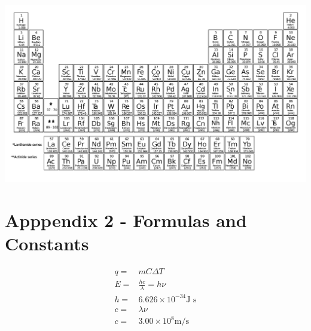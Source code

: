 \documentclass[12pt]{exam}		%
\begin{document}
\begin{center}
  \includegraphics[scale=0.24,angle=90]{periodic_table}
\end{center}

\section{Apppendix 2 - Formulas and Constants}

\begin{align*}
  q = & mC\Delta T \\
  E = & \frac{hc}{\lambda} = h\nu \\
  h = & 6.626 \times 10^{-34} \text{J s} \\
  c = & \lambda \nu \\
  c = & 3.00 \times 10^8 \text{m/s}
\end{align*}
\end{document}

